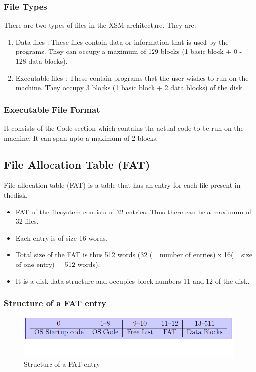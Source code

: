\documentclass[11pt]{article}
\begin{document}
\subsubsection{File Types}
There are two types of files in the XSM architecture. They are:
\begin{enumerate}
\item Data files : These files contain data or information that is used by the programs. They can occupy a maximum of 129 blocks (1 basic block + 0 - 128 data blocks).
\item Executable files : These contain programs that the user wishes to run on the machine. They occupy 3 blocks (1 basic block + 2 data blocks) of the disk.
\end{enumerate}


\subsubsection{Executable File Format}

It consists of the Code section which contains the actual code to be run on the machine. It can span upto a maximum of 2 blocks.


\subsection{File Allocation Table (FAT)}
File allocation table (FAT) is a table that has an entry for each file present in thedisk.
\begin{itemize}
\item FAT of the filesystem consists of 32 entries. Thus there can be a maximum of 32 files.
\item Each entry is of size 16 words.
\item Total size of the FAT is thus 512 words (32 (= number of entries) x 16(= size of one entry) = 512 words).
\item It is a disk data structure and occupies block numbers 11 and 12 of the disk.
\end{itemize}

\subsubsection{Structure of a FAT entry}

\begin{figure}
\begin{center}
\includegraphics[scale=0.5]{fileblockdiagram.png}
\end{center}
\caption{Structure of a FAT entry}
\end{figure}
\end{document}
